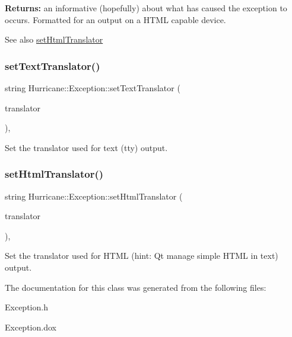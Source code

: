 {\bfseries Returns\+:} an informative (hopefully) about what has caused the exception to occurs. Formatted for an output on a H\+T\+ML capable device.

\begin{DoxySeeAlso}{See also}
\hyperlink{classHurricane_1_1Exception_a0effe808df00f4efe10925131304b8d0}{set\+Html\+Translator} 
\end{DoxySeeAlso}
\mbox{\label{classHurricane_1_1Exception_a1a57fbbc4b57a014558ba31d18ec9b62}} 
\subsubsection{\texorpdfstring{set\+Text\+Translator()}{setTextTranslator()}}
{\footnotesize\ttfamily string Hurricane\+::\+Exception\+::set\+Text\+Translator (\begin{DoxyParamCaption}\item[{const Text\+Translator \&}]{translator }\end{DoxyParamCaption})\hspace{0.3cm}{\ttfamily [inline]}, {\ttfamily [static]}}

Set the translator used for text (tty) output. \mbox{\label{classHurricane_1_1Exception_a0effe808df00f4efe10925131304b8d0}} 
\subsubsection{\texorpdfstring{set\+Html\+Translator()}{setHtmlTranslator()}}
{\footnotesize\ttfamily string Hurricane\+::\+Exception\+::set\+Html\+Translator (\begin{DoxyParamCaption}\item[{const Text\+Translator \&}]{translator }\end{DoxyParamCaption})\hspace{0.3cm}{\ttfamily [inline]}, {\ttfamily [static]}}

Set the translator used for H\+T\+ML (hint\+: Qt manage simple H\+T\+ML in text) output. 

The documentation for this class was generated from the following files\+:\begin{DoxyCompactItemize}
\item 
Exception.\+h\item 
Exception.\+dox\end{DoxyCompactItemize}
